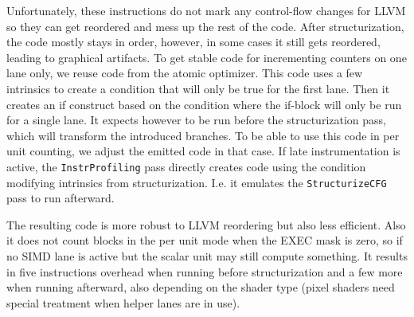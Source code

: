 Unfortunately, these instructions do not mark any control-flow changes for LLVM so they can get reordered and mess up the rest of the code.
After structurization, the code mostly stays in order, however, in some cases it still gets reordered, leading to graphical artifacts.
To get stable code for incrementing counters on one lane only, we reuse code from the atomic optimizer.
This code uses a few intrinsics to create a condition that will only be true for the first lane.
Then it creates an if construct based on the condition where the if-block will only be run for a single lane.
It expects however to be run before the structurization pass, which will transform the introduced branches.
To be able to use this code in per unit counting, we adjust the emitted code in that case.
If late instrumentation is active, the \texttt{InstrProfiling} pass directly creates code using the condition modifying intrinsics from structurization.
I.e. it emulates the \texttt{StructurizeCFG} pass to run afterward.

The resulting code is more robust to LLVM reordering but also less efficient.
Also it does not count blocks in the per unit mode when the EXEC mask is zero, so if no SIMD lane is active but the scalar unit may still compute something.
It results in five instructions overhead when running before structurization and a few more when running afterward, also depending on the shader type (pixel shaders need special treatment when helper lanes are in use).
